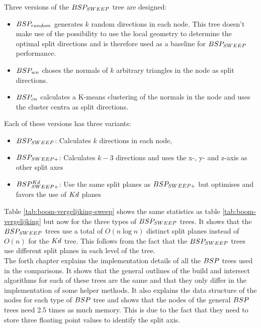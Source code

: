 Three versions of the $BSP_{SWEEP}$ tree are designed:
\begin{itemize}
  \item $BSP_{random}$ generates $k$ random directions in each node. This tree doesn't make use of the possibility to use the local geometry to determine the optimal split directions and is therefore used as a baseline for $BSP_{SWEEP}$ performance.
  \item $BSP_{wn}$ choses the normals of $k$ arbitrary triangles in the node as split directions.
  \item $BSP_{cn}$ calculates a K-means clustering of the normals in the node and uses the cluster centra as split directions.
\end{itemize}

Each of these versions has three variants:
\begin{itemize}
  \item $BSP_{SWEEP}$: Calculates $k$ directions in each node,
  \item $BSP_{SWEEP+}$: Calculates $k-3$ directions and uses the x-, y- and z-axis as other split axes
  \item $BSP^{Kd}_{SWEEP+}$: Use the same split planes as $BSP_{SWEEP+}$ but optimises and favors the use of $Kd$ planes 
\end{itemize}

Table \ref{tab:boom-vergelijking-sweep} shows the same statistics as table \ref{tab:boom-vergelijking} but now for the three types of $BSP_{SWEEP}$ trees. It shows that the $BSP_{SWEEP}$ trees use a total of $O(n\log n)$ distinct split planes instead of $O(n)$ for the $Kd$ tree. This follows from the fact that the $BSP_{SWEEP}$ trees use different split planes in each level of the tree.\\

The forth chapter explains the implementation details of all the $BSP$ trees used in the comparisons.
It shows that the general outlines of the build and intersect algorithms for each of these trees are the same and that they only differ in the implementation of some helper methods.
It also explains the data structure of the nodes for each type of $BSP$ tree and shows that the nodes of the general $BSP$ trees need 2.5 times as much memory. This is due to the fact that they need to store three floating point values to identify the split axis.\\

